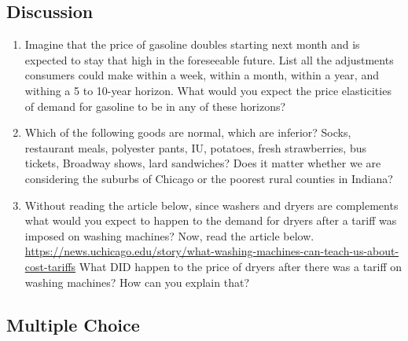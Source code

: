 \documentclass[
]{book}
\providecommand{\tightlist}{%
  \setlength{\itemsep}{0pt}\setlength{\parskip}{0pt}}
\begin{document}
\hypertarget{discussion-4}{%
\subsection{Discussion}\label{discussion-4}}

\begin{enumerate}
\def\labelenumi{\arabic{enumi}.}
\tightlist
\item
  Imagine that the price of gasoline doubles starting next month and is expected to stay that high in the foreseeable future. List all the adjustments consumers could make within a week, within a month, within a year, and withing a 5 to 10-year horizon. What would you expect the price elasticities of demand for gasoline to be in any of these horizons?\\
\item
  Which of the following goods are normal, which are inferior?
  Socks, restaurant meals, polyester pants, IU, potatoes, fresh strawberries, bus tickets, Broadway shows, lard sandwiches?
  Does it matter whether we are considering the suburbs of Chicago or the poorest rural counties in Indiana?
\item
  Without reading the article below, since washers and dryers are complements what would you expect to happen to the demand for dryers after a tariff was imposed on washing machines? Now, read the article below. \url{https://news.uchicago.edu/story/what-washing-machines-can-teach-us-about-cost-tariffs} What DID happen to the price of dryers after there was a tariff on washing machines? How can you explain that?
\end{enumerate}

\hypertarget{multiple-choice-4}{%
\subsection{Multiple Choice}\label{multiple-choice-4}}
\end{document}

